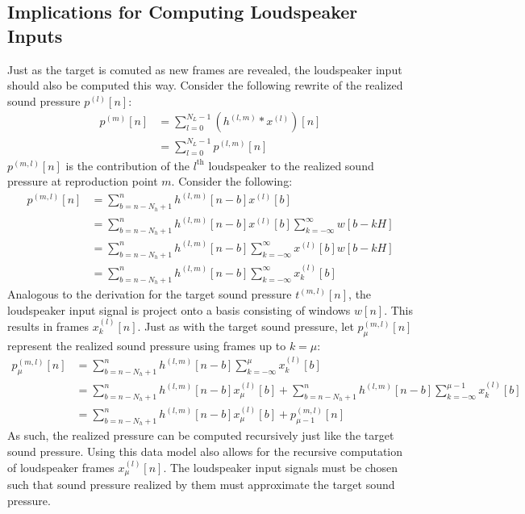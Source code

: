 \subsection{Implications for Computing Loudspeaker Inputs}
Just as the target is comuted as new frames are revealed, the loudspeaker input should also be computed this way.
Consider the following rewrite of the realized sound pressure $p^{(l)}[n]$:
\begin{align}
    p^{(m)}[n] &= \sum_{l=0}^{N_L - 1} \left(h^{(l,m)} \ast x^{(l)}\right)[n] \\
               &= \sum_{l=0}^{N_L - 1} p^{(l,m)}[n]
\end{align}
$p^{(m,l)}[n]$ is the contribution of the $l^\text{th}$ loudspeaker to the realized sound pressure at reproduction point $m$.
Consider the following:
\begin{align}
    p^{(m,l)}[n]   &= \sum_{b = n - N_h + 1}^{n} h^{(l,m)}[n - b] x^{(l)}[b] \\
                    &= \sum_{b = n - N_h + 1}^{n} h^{(l,m)}[n - b] x^{(l)}[b] 
                        \sum_{k=-\infty}^{\infty} w[b - kH] \\
                    &= \sum_{b = n - N_h + 1}^{n} h^{(l,m)}[n - b]  
                        \sum_{k=-\infty}^{\infty} x^{(l)}[b] w[b - kH] \\
                    &= \sum_{b = n - N_h + 1}^{n} h^{(l,m)}[n - b]  
                        \sum_{k=-\infty}^{\infty} x_k^{(l)}[b]  
\end{align}
Analogous to the derivation for the target sound pressure $t^{(m,l)}[n]$, the loudspeaker input signal is project onto a basis consisting of windows $w[n]$.
This results in frames $x_k^{(l)}[n]$. 
Just as with the target sound pressure, let $p_\mu^{(m,l)}[n]$ represent the realized sound pressure using frames up to $k = \mu$: 
\begin{align}
    p_\mu^{(m,l)}[n] &= \sum_{b = n - N_h + 1}^{n} h^{(l,m)}[n - b] 
                        \sum_{k=-\infty}^{\mu} x_k^{(l)}[b] \\
                     &= \sum_{b = n - N_h + 1}^{n} h^{(l,m)}[n - b] 
                        x_\mu^{(l)}[b] + \sum_{b = n - N_h + 1}^{n} h^{(l,m)}[n - b] 
                        \sum_{k=-\infty}^{\mu - 1} x_k^{(l)}[b] \\
                     &= \sum_{b = n - N_h + 1}^{n} h^{(l,m)}[n - b] 
                        x_\mu^{(l)}[b] + p_{\mu - 1}^{(m,l)}[n]
\end{align}
As such, the realized pressure can be computed recursively just like the target sound pressure.
Using this data model also allows for the recursive computation of loudspeaker frames $x_\mu^{(l)}[n]$.
The loudspeaker input signals must be chosen such that sound pressure realized by them must approximate the target sound pressure.


